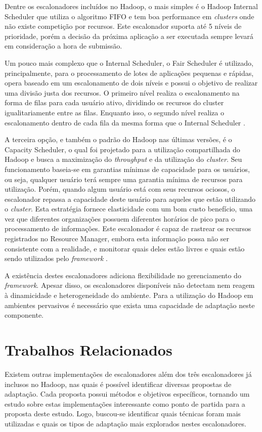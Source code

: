 Dentre os escalonadores incluídos no Hadoop, o mais simples é o Hadoop Internal Scheduler que utiliza o algoritmo FIFO e tem boa performance em \textit{clusters} onde não existe competição por recursos. Este escalonador suporta até 5 níveis de prioridade, porém a decisão da próxima aplicação a ser executada sempre levará em consideração a hora de submissão.

Um pouco mais complexo que o Internal Scheduler, o Fair Scheduler é utilizado, principalmente, para o processamento de lotes de aplicações pequenas e rápidas, opera baseado em um escalonamento de dois níveis e possui o objetivo de realizar uma divisão justa dos recursos. O primeiro nível realiza o escalonamento na forma de filas para cada usuário ativo, dividindo os recursos do cluster igualitariamente entre as filas. Enquanto isso, o segundo nível realiza o escalonamento dentro de cada fila da mesma forma que o Internal Scheduler \cite{FairScheduler}. 

A terceira opção, e também o padrão do Hadoop nas últimas versões, é o Capacity Scheduler, o qual foi projetado para a utilização compartilhada do Hadoop e busca a maximização do \textit{throughput} e da utilização do \textit{cluster}. Seu funcionamento baseia-se em garantias mínimas de capacidade para os usuários, ou seja, qualquer usuário terá sempre uma garantia mínima de recursos para utilização. Porém, quando algum usuário está com seus recursos ociosos, o escalonador repassa a capacidade deste usuário  para aqueles que estão utilizando o \textit{cluster}. Esta estratégia fornece elasticidade com um bom custo benefício, uma vez que diferentes organizações possuem diferentes horários de pico para o processamento de informações. Este escalonador é capaz de rastrear os recursos registrados no Resource Manager, embora esta informação possa não ser consistente com a realidade, e monitorar quais deles estão livres e quais estão sendo utilizados pelo \textit{framework} \cite{CapacityScheduler}.

A existência destes escalonadores adiciona flexibilidade no gerenciamento do \textit{framework}. Apesar disso, os escalonadores disponíveis não detectam nem reagem à dinamicidade e heterogeneidade do ambiente. Para a utilização do Hadoop em ambientes pervasivos é necessário que exista uma capacidade de adaptação neste componente.





\section{Trabalhos Relacionados}
Existem outras implementações de escalonadores além dos três escalonadores já inclusos no Hadoop, nas quais é possível identificar diversas propostas de adaptação. Cada proposta possui métodos e objetivos específicos, tornando um estudo sobre estas implementações interessante como ponto de partida para a proposta deste estudo. Logo, buscou-se identificar quais técnicas foram mais utilizadas e quais os tipos de adaptação mais explorados nestes escalonadores. 

